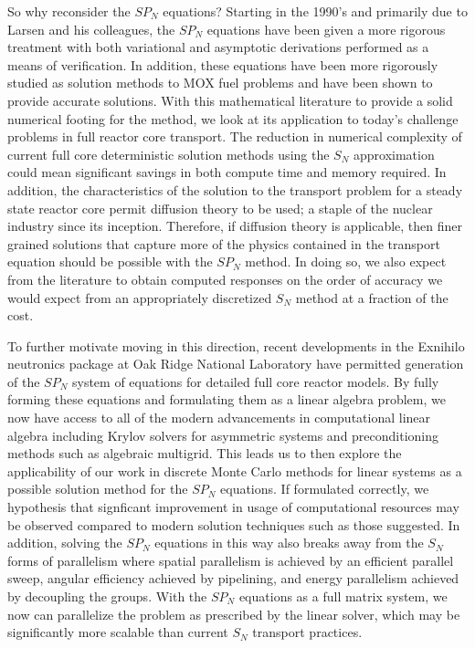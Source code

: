 \documentclass[letterpaper,12pt]{article}
\begin{document}
So why reconsider the $SP_N$ equations? Starting in the 1990's and
primarily due to Larsen and his colleagues, the $SP_N$ equations have
been given a more rigorous treatment with both variational and
asymptotic derivations performed as a means of verification. In
addition, these equations have been more rigorously studied as
solution methods to MOX fuel problems and have been shown to provide
accurate solutions. With this mathematical literature to provide a
solid numerical footing for the method, we look at its application to
today's challenge problems in full reactor core transport. The
reduction in numerical complexity of current full core deterministic
solution methods using the $S_N$ approximation could mean significant
savings in both compute time and memory required. In addition, the
characteristics of the solution to the transport problem for a steady
state reactor core permit diffusion theory to be used; a staple of the
nuclear industry since its inception. Therefore, if diffusion theory
is applicable, then finer grained solutions that capture more of the
physics contained in the transport equation should be possible with
the $SP_N$ method. In doing so, we also expect from the literature to
obtain computed responses on the order of accuracy we would expect
from an appropriately discretized $S_N$ method at a fraction of the
cost. 

To further motivate moving in this direction, recent developments in
the Exnihilo neutronics package at Oak Ridge National Laboratory have
permitted generation of the $SP_N$ system of equations for detailed
full core reactor models. By fully forming these equations and
formulating them as a linear algebra problem, we now have access to
all of the modern advancements in computational linear algebra
including Krylov solvers for asymmetric systems and preconditioning
methods such as algebraic multigrid. This leads us to then explore the
applicability of our work in discrete Monte Carlo methods for linear
systems as a possible solution method for the $SP_N$ equations. If
formulated correctly, we hypothesis that signficant improvement in
usage of computational resources may be observed compared to modern
solution techniques such as those suggested. In addition, solving the
$SP_N$ equations in this way also breaks away from the $S_N$ forms of
parallelism where spatial parallelism is achieved by an efficient
parallel sweep, angular efficiency achieved by pipelining, and energy
parallelism achieved by decoupling the groups. With the $SP_N$
equations as a full matrix system, we now can parallelize the problem
as prescribed by the linear solver, which may be significantly more
scalable than current $S_N$ transport practices.
\end{document}
